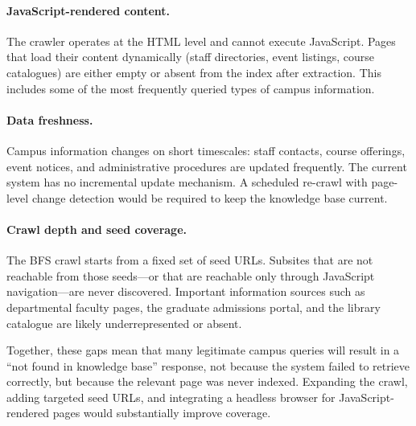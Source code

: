 \paragraph{JavaScript-rendered content.} The crawler operates at the HTML level and cannot execute JavaScript. Pages that load their content dynamically (staff directories, event listings, course catalogues) are either empty or absent from the index after extraction. This includes some of the most frequently queried types of campus information.

\paragraph{Data freshness.} Campus information changes on short timescales: staff contacts, course offerings, event notices, and administrative procedures are updated frequently. The current system has no incremental update mechanism. A scheduled re-crawl with page-level change detection would be required to keep the knowledge base current.

\paragraph{Crawl depth and seed coverage.} The BFS crawl starts from a fixed set of seed URLs. Subsites that are not reachable from those seeds---or that are reachable only through JavaScript navigation---are never discovered. Important information sources such as departmental faculty pages, the graduate admissions portal, and the library catalogue are likely underrepresented or absent.

Together, these gaps mean that many legitimate campus queries will result in a ``not found in knowledge base'' response, not because the system failed to retrieve correctly, but because the relevant page was never indexed. Expanding the crawl, adding targeted seed URLs, and integrating a headless browser for JavaScript-rendered pages would substantially improve coverage.
